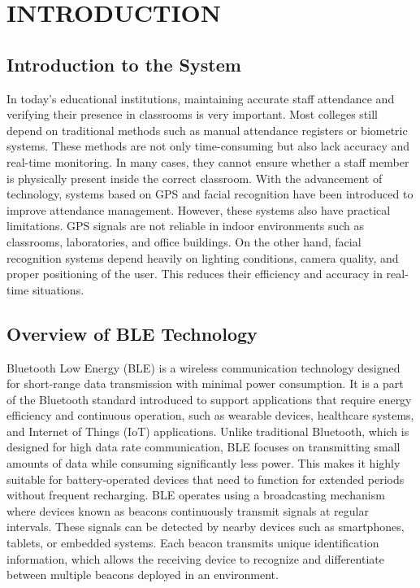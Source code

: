 \chapter{INTRODUCTION}

\section{Introduction to the System}
In today’s educational institutions, maintaining accurate staff attendance and verifying their presence in classrooms is very important. Most colleges still depend on traditional methods such as manual attendance registers or biometric systems. These methods are not only time-consuming but also lack accuracy and real-time monitoring. In many cases, they cannot ensure whether a staff member is physically present inside the correct classroom. With the advancement of technology, systems based on GPS and facial recognition have been introduced to improve attendance management. However, these systems also have practical limitations. GPS signals are not reliable in indoor environments such as classrooms, laboratories, and office buildings. On the other hand, facial recognition systems depend heavily on lighting conditions, camera quality, and proper positioning of the user. This reduces their efficiency and accuracy in real-time situations.

\section{Overview of BLE Technology}
Bluetooth Low Energy (BLE) is a wireless communication technology designed for short-range data transmission with minimal power consumption. It is a part of the Bluetooth standard introduced to support applications that require energy efficiency and continuous operation, such as wearable devices, healthcare systems, and Internet of Things (IoT) applications. Unlike traditional Bluetooth, which is designed for high data rate communication, BLE focuses on transmitting small amounts of data while consuming significantly less power. This makes it highly suitable for battery-operated devices that need to function for extended periods without frequent recharging. BLE operates using a broadcasting mechanism where devices known as beacons continuously transmit signals at regular intervals. These signals can be detected by nearby devices such as smartphones, tablets, or embedded systems. Each beacon transmits unique identification information, which allows the receiving device to recognize and differentiate between multiple beacons deployed in an environment.

